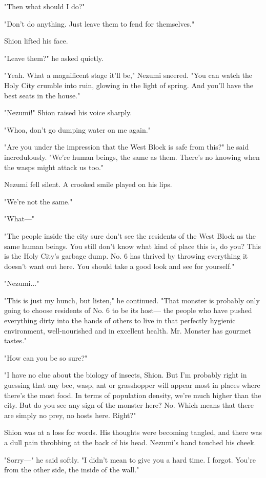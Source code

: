 "Then what should I do?"

"Don't do anything. Just leave them to fend for themselves."

Shion lifted his face.

"Leave them?" he asked quietly.

"Yeah. What a magnificent stage it'll be," Nezumi sneered. "You can
watch the Holy City crumble into ruin, glowing in the light of spring.
And you'll have the best seats in the house."

"Nezumi!" Shion raised his voice sharply.

"Whoa, don't go dumping water on me again."

"Are you under the impression that the West Block is safe from this?" he
said incredulously. "We're human beings, the same as them. There's no
knowing when the wasps might attack us too."

Nezumi fell silent. A crooked smile played on his lips.

"We're not the same."

"What---"

"The people inside the city sure don't see the residents of the West
Block as the same human beings. You still don't know what kind of place
this is, do you? This is the Holy City's garbage dump. No. 6 has thrived
by throwing everything it doesn't want out here. You should take a good
look and see for yourself."

"Nezumi..."

"This is just my hunch, but listen," he continued. "That monster is
probably only going to choose residents of No. 6 to be its host--- the
people who have pushed everything dirty into the hands of others to live
in that perfectly hygienic environment, well-nourished and in excellent
health. Mr. Monster has gourmet tastes."

"How can you be so sure?"

"I have no clue about the biology of insects, Shion. But I'm probably
right in guessing that any bee, wasp, ant or grasshopper will appear
most in places where there's the most food. In terms of population
density, we're much higher than the city. But do you see any sign of the
monster here? No. Which means that there are simply no prey, no hosts
here. Right?"

Shion was at a loss for words. His thoughts were becoming tangled, and
there was a dull pain throbbing at the back of his head. Nezumi's hand
touched his cheek.

"Sorry---" he said softly. "I didn't mean to give you a hard time. I
forgot. You're from the other side, the inside of the wall."

